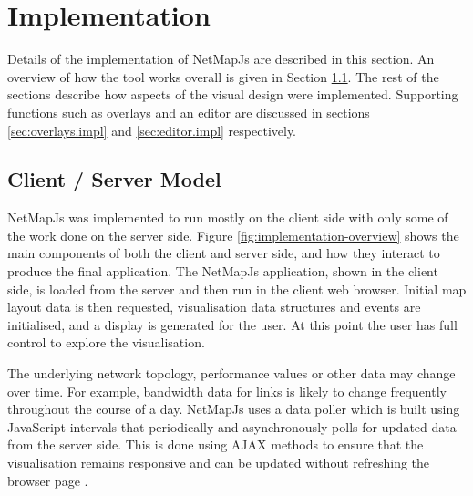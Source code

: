 \documentclass[11pt, a4paper]{article}
\begin{document}
\newpage

\section{Implementation} 
\label{sec:implementation}

Details of the implementation of NetMapJs are described in this section. An
overview of how the tool works overall is given in Section
\ref{sec:client-server-model.impl}. The rest of the sections describe how
aspects of the visual design were implemented. Supporting functions such as
overlays and an editor are discussed in sections \ref{sec:overlays.impl} and
\ref{sec:editor.impl} respectively.

\subsection{Client / Server Model}
\label{sec:client-server-model.impl}

NetMapJs was implemented to run mostly on the client side with only some of the
work done on the server side. Figure \ref{fig:implementation-overview} shows the
main components of both the client and server side, and how they interact to
produce the final application. The NetMapJs application, shown in the client
side, is loaded from the server and then run in the client web browser. Initial
map layout data is then requested, visualisation data structures and events are
initialised, and a display is generated for the user. At this point the user has
full control to explore the visualisation.

The underlying network topology, performance values or other data may change
over time. For example, bandwidth data for links is likely to change frequently
throughout the course of a day. NetMapJs uses a data poller which is built using
JavaScript intervals that periodically and asynchronously polls for updated data
from the server side. This is done using AJAX methods to ensure that the
visualisation remains responsive and can be updated without refreshing the
browser page \cite{Paulson_2005}.
\end{document}
